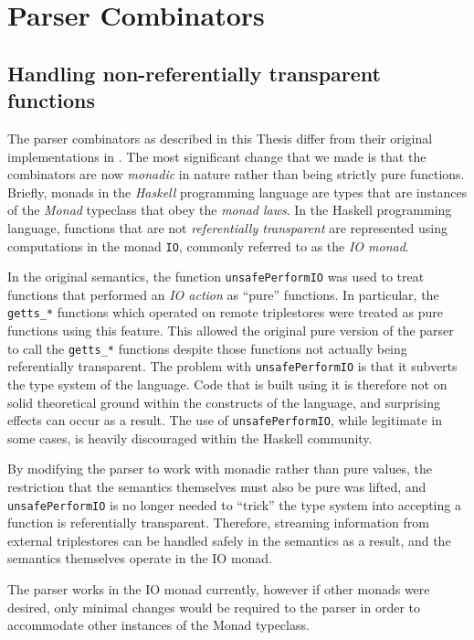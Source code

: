 \documentclass[../main.tex]{subfiles}
\begin{document}
\chapter{Parser Combinators}

\section{Handling non-referentially transparent functions}

The parser combinators as described in this Thesis differ from their original implementations
in \cite{frosthafiz2008}.  The most significant change that we made is that the combinators are now {\em monadic} in nature rather than being strictly pure functions.
Briefly, monads in the {\em Haskell} programming language are types that are instances of the {\em Monad} typeclass that obey the
{\em monad laws}.  In the Haskell programming language, functions that are not {\em referentially transparent} are represented using computations in the monad \texttt{IO}, commonly referred to as the {\em IO monad}.

In the original semantics, the function \texttt{unsafePerformIO} was used to treat functions that performed an {\em IO action} as ``pure'' functions.
In particular, the \texttt{getts\_*} functions which operated on remote triplestores were treated as pure functions using this feature.  This allowed
the original pure version of the parser to call the \texttt{getts\_*} functions despite those functions not actually being referentially transparent.  The problem
with \texttt{unsafePerformIO} is that it subverts the type system of the language.  Code that is built using it is therefore not on
solid theoretical ground within the constructs of the language, and surprising effects can occur as a result.  The use of \texttt{unsafePerformIO}, while
legitimate in some cases, is heavily discouraged within the Haskell community.

By modifying the parser to work with monadic rather than pure values, the restriction that the semantics themselves must also be pure was lifted, and
\texttt{unsafePerformIO} is no longer needed to ``trick'' the type system into accepting a function is referentially transparent.
Therefore, streaming information from external triplestores can be handled safely in the semantics as a result, and the semantics themselves
operate in the IO monad.

The parser works in the IO monad currently, however if other monads were desired, only minimal changes would be required to the parser in order to accommodate
other instances of the Monad typeclass.
\end{document}
